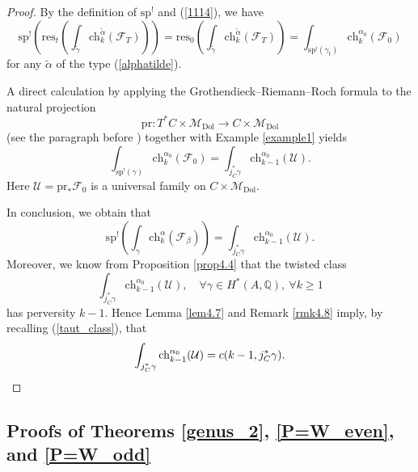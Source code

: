\documentclass[11pt]{amsart}
\theoremstyle{plain}
\theoremstyle{definition}
\theoremstyle{remark}
\newcommand{\BQ}{{\mathbb{Q}}}
\newcommand{\CF}{{\mathcal F}}
\newcommand{\CM}{{\mathcal M}}
\newcommand{\CU}{{\mathcal U}}
\begin{document}
\begin{proof}
By the definition of $\mathrm{sp}^!$ and (\ref{1114}), we have
\[
\mathrm{sp}^!\left( \mathrm{res}_t\left( \int_{\tilde{\gamma}} \mathrm{ch}_k^{\tilde{\alpha}} (\CF_T) \right)\right) = \mathrm{res}_0\left( \int_{\tilde{\gamma}} \mathrm{ch}_k^{\tilde{\alpha}} (\CF_T) \right)= \int_{\mathrm{sp}^!(\gamma_t)} \mathrm{ch}_k^{\alpha_0}(\CF_0)
\]
for any $\tilde{\alpha}$ of the type (\ref{alphatilde}). 


A direct calculation by applying the Grothendieck--Riemann--Roch formula to the natural projection 
\[
\mathrm{pr}: T^*C\times \CM_{\mathrm{Dol}} \to C\times \CM_{\mathrm{Dol}} 
\]
(see the paragraph before \cite[Remark 8]{Markman3}) together with Example \ref{example1} yields
\begin{equation*}\label{997}
\int_{\mathrm{sp}^!(\gamma)} \mathrm{ch}_k^{\alpha_0} (\CF_0) = \int_{j_C^*\gamma} \mathrm{ch}_{k-1}^{\alpha_0}(\CU).
\end{equation*}
Here $\CU = \mathrm{pr}_* \CF_0$ is a universal family on $C\times \CM_{\mathrm{Dol}}$.

In conclusion, we obtain that
\[
\mathrm{sp}^!\left( \int_{\gamma} \mathrm{ch}_k^\alpha (\CF_\beta) \right) = \int_{j_C^*\gamma} \mathrm{ch}_{k-1}^{\alpha_0}(\CU).
\]
Moreover, we know from Proposition \ref{prop4.4} that the twisted class \[
\int_{j_C^*\gamma} \mathrm{ch}_{k-1}^{\alpha_0}(\CU),\quad \forall \gamma \in H^*(A, \BQ),~ \forall k\geq 1
\]
has perversity $k-1$. Hence Lemma \ref{lem4.7} and Remark \ref{rmk4.8} imply, by recalling (\ref{taut_class}), that 
\[
\int_{j_C^*\gamma} \mathrm{ch}_{k-1}^{\alpha_0}(\CU) = c(k-1, j_C^*\gamma). \qedhere
\]
\end{proof}

\subsection{Proofs of Theorems \ref{genus_2}, \ref{P=W_even}, and \ref{P=W_odd}}\label{Section4.6}
\end{document}
